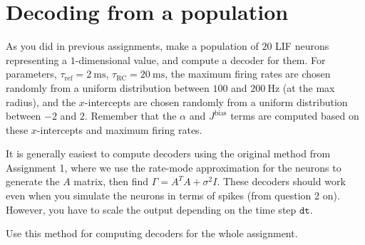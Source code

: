 %
%
%
%



\newcommand{\assignmentCourse}{SYDE 556/750}
\newcommand{\assignmentCourseName}{Simulating Neurobiological Systems}
\newcommand{\assignmentName}{Assignment 3}
\newcommand{\assignmentNo}{03}
\newcommand{\assignmentTerm}{Winter 2020}
\newcommand{\assignmentDue}{March 3, 2020}
\newcommand{\assignmentMarks}{10 marks (10\% of the final grade)}
\newcommand{\assignmentURL}{https://github.com/astoeckel/syde556-w20/blob/master/assignments/assignment_03/syde556_assignment_03_template.ipynb}
\newcommand{\assignmentEmail}{astoecke@uwaterloo.ca}
\newcommand{\assignmentExtraNotes}{\item \textbf{Do not use or refer to any code from Nengo!}}


	\assignmentHeader

	\section{Decoding from a population}
	
	As you did in previous assignments, make a population of $20$ LIF neurons representing a $1$-dimensional value, and compute a decoder for them. For parameters, $\tau_\mathrm{ref}=\SI{2}{\milli\second}$, $\tau_\mathrm{RC}=\SI{20}{\milli\second}$, the maximum firing rates are chosen randomly from a uniform distribution between $100$ and $\SI{200}{\hertz}$ (at the max radius), and the $x$-intercepts are chosen randomly from a uniform distribution between $-2$ and $2$. Remember that the $\alpha$ and $J^\mathrm{bias}$ terms are computed based on these $x$-intercepts and maximum firing rates.
		
	It is generally easiest to compute decoders using the original method from Assignment 1, where we use the rate-mode approximation for the neurons to generate the $A$ matrix, then find $\Gamma=A^T A + \sigma^2 I$. These decoders should work even when you simulate the neurons in terms of spikes (from question 2 on). However, you have to scale the output depending on the time step $\mathtt{dt}$.
		
	Use this method for computing decoders for the whole assignment.

